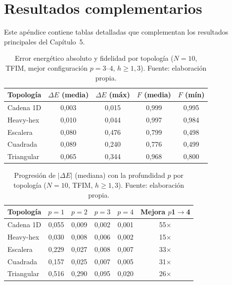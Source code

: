 \documentclass[11pt,a4paper,spanish]{book}
\begin{document}

\chapter{Resultados complementarios}
\label{app:results}

Este apéndice contiene tablas detalladas que complementan los resultados principales del Capítulo~5.

\begin{table}[h]
\centering
\caption[Error energético absoluto y fidelidad por topología]{Error energético absoluto y fidelidad por topología ($N = 10$, TFIM, mejor configuración $p=3$--$4$, $h \geq 1,3$). Fuente: elaboración propia.}
\label{tab:cross_topo_de}
\begin{tabular}{lcccc}
\toprule
\textbf{Topología} & \textbf{$\Delta E$ (media)} & \textbf{$\Delta E$ (máx)} & \textbf{$F$ (media)} & \textbf{$F$ (mín)} \\
\midrule
Cadena 1D & 0,003 & 0,015 & 0,999 & 0,995 \\
Heavy-hex & 0,010 & 0,044 & 0,997 & 0,984 \\
Escalera & 0,080 & 0,476 & 0,799 & 0,498 \\
Cuadrada & 0,089 & 0,240 & 0,776 & 0,499 \\
Triangular & 0,065 & 0,344 & 0,968 & 0,800 \\
\bottomrule
\end{tabular}
\end{table}

\begin{table}[h]
\centering
\caption[Progresión del error absoluto con la profundidad]{Progresión de $|\Delta E|$ (mediana) con la profundidad $p$ por topología ($N = 10$, TFIM, $h \geq 1,3$). Fuente: elaboración propia.}
\label{tab:delta_e_vs_p}
\begin{tabular}{lccccc}
\toprule
\textbf{Topología} & \textbf{$p = 1$} & \textbf{$p = 2$} & \textbf{$p = 3$} & \textbf{$p = 4$} & \textbf{Mejora $p$1$\to$4} \\
\midrule
Cadena 1D   & 0,055 & 0,009 & 0,002 & 0,001 & 55$\times$ \\
Heavy-hex   & 0,030 & 0,008 & 0,006 & 0,002 & 15$\times$ \\
Escalera    & 0,229 & 0,027 & 0,008 & 0,007 & 33$\times$ \\
Cuadrada    & 0,157 & 0,025 & 0,007 & 0,005 & 31$\times$ \\
Triangular  & 0,516 & 0,290 & 0,095 & 0,020 &  26$\times$ \\
\bottomrule
\end{tabular}
\end{table}
\end{document}
